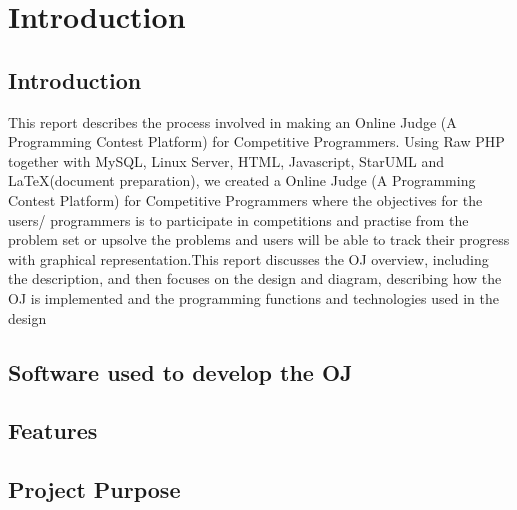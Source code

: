 
\chapter{Introduction}

\pagebreak


\section{Introduction}
This report describes the process involved in making an Online Judge (A Programming Contest Platform) for Competitive Programmers. Using Raw PHP together with MySQL, Linux Server, HTML, Javascript, StarUML and \LaTeX(document preparation), we created a Online Judge (A Programming Contest Platform) for Competitive Programmers where the objectives for the users/ programmers is to participate in competitions and practise from the problem set or upsolve the problems and users will be able to track their progress with graphical representation.This report discusses the OJ overview, including the description, and then focuses on the design and diagram, describing how the OJ is implemented and the programming functions and technologies used in the design


\section{Software used to develop the OJ}

\section{Features}

\section{Project Purpose} 